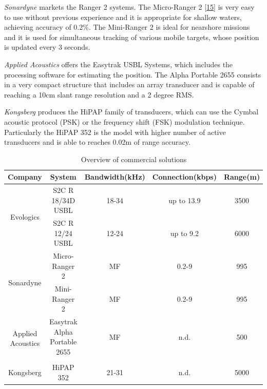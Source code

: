 \textit{Sonardyne} markets the Ranger 2 systems. The Micro-Ranger 2 [\hyperref[r:sonardyne1]{15}] is very easy to use without previous experience and it is appropriate for shallow waters, achieving accuracy of 0.2\%. The Mini-Ranger 2 is ideal for nearshore missions and it is  used for simultaneous tracking of various mobile targets, whose position is updated every 3 seconds.

\textit{Applied Acoustics} offers the Easytrak USBL Systems, which includes the processing software for estimating the position. The Alpha Portable 2655 consists in a very compact structure that includes an array transducer and is capable of reaching a 10cm slant range resolution and a 2 degree RMS.

\textit{Kongsberg} produces the HiPAP family of transducers, which can use the Cymbal acoustic protocol (PSK) or the frequency shift (FSK) modulation technique. Particularly the HiPAP 352 is the model with higher number of active transducers and is able to reaches 0.02m of range accuracy.

\begin{table}[t]
	\centering
	\begin{tabular}{|c|c|c c c|}
		\hline
		Company
		& System
		& Bandwidth(kHz)
		& Connection(kbps)
		& Range(m) \\ \hline 
		\multirow{2}{4em}{Evologics} 
		& S2C R 18/34D USBL & 18-34 & up to 13.9 & 3500\\
		& S2C R 12/24 USBL & 12-24 & up to 9.2 & 6000\\
		\hline 
		\multirow{2}{4em}{Sonardyne} 
		& Micro-Ranger 2 & MF & 0.2-9 & 995\\
		& Mini-Ranger 2 & MF & 0.2-9 & 995\\ 
		\hline 
		\multirow{2}{4em}{Applied Acoustics} 
		& Easytrak Alpha Portable 2655 & MF & n.d. & 500 \\
		&  &  &  & \\
		\hline 
		\multirow{1}{4em}{Kongsberg} 
		& HiPAP 352 & 21-31 & n.d. & 5000 \\
		\hline 
	\end{tabular}
	\caption{Overview of commercial solutions}
	\label{tab:solutions}
\end{table}







